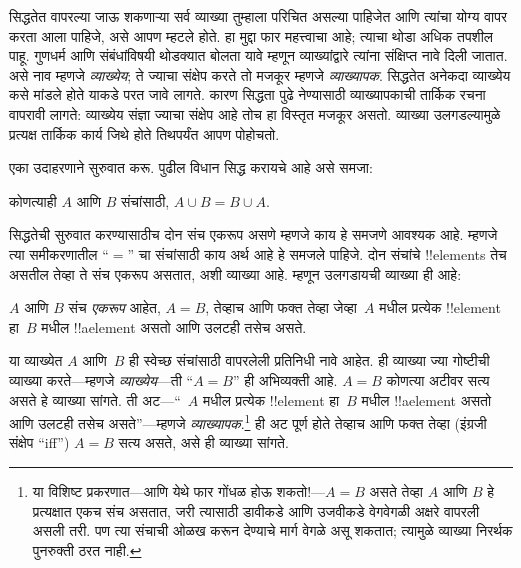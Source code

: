 \documentclass[../../../include/open-logic-section]{subfiles}
\begin{document}


सिद्धतेत वापरल्या जाऊ शकणाऱ्या सर्व व्याख्या तुम्हाला परिचित असल्या पाहिजेत आणि त्यांचा योग्य वापर करता आला पाहिजे, असे आपण म्हटले होते. हा मुद्दा फार महत्त्वाचा आहे; त्याचा थोडा अधिक तपशील पाहू. गुणधर्म आणि संबंधांविषयी थोडक्यात बोलता यावे म्हणून व्याख्यांद्वारे त्यांना संक्षिप्त नावे दिली जातात. असे नाव म्हणजे \emph{व्याख्येय}; ते ज्याचा संक्षेप करते तो मजकूर म्हणजे \emph{व्याख्यापक}. सिद्धतेत अनेकदा व्याख्येय कसे मांडले होते याकडे परत जावे लागते. कारण सिद्धता पुढे नेण्यासाठी व्याख्यापकाची तार्किक रचना वापरावी लागते: व्याख्येय संज्ञा ज्याचा संक्षेप आहे तोच हा विस्तृत मजकूर असतो. व्याख्या उलगडल्यामुळे प्रत्यक्ष तार्किक कार्य जिथे होते तिथपर्यंत आपण पोहोचतो.

एका उदाहरणाने सुरुवात करू. पुढील विधान सिद्ध करायचे आहे असे समजा:

\begin{prop}
कोणत्याही $A$ आणि $B$ संचांसाठी, $A \cup B = B \cup A$.
\end{prop}

सिद्धतेची सुरुवात करण्यासाठीच दोन संच एकरूप असणे म्हणजे काय हे समजणे आवश्यक आहे. म्हणजे त्या समीकरणातील “$=$” चा संचांसाठी काय अर्थ आहे हे समजले पाहिजे. दोन संचांचे !!{element}s तेच असतील तेव्हा ते संच एकरूप असतात, अशी व्याख्या आहे. म्हणून उलगडायची व्याख्या ही आहे:

\begin{defn}
$A$ आणि $B$ संच \emph{एकरूप} आहेत, $A = B$, तेव्हाच आणि फक्त तेव्हा जेव्हा~$A$ मधील प्रत्येक !!{element} हा~$B$ मधील !!a{element} असतो आणि उलटही तसेच असते.
\end{defn}

या व्याख्येत $A$ आणि~$B$ ही स्वेच्छ संचांसाठी वापरलेली प्रतिनिधी नावे आहेत. ही व्याख्या ज्या गोष्टीची व्याख्या करते---म्हणजे \emph{व्याख्येय}---ती “$A = B$” ही अभिव्यक्ती आहे. $A = B$ कोणत्या अटीवर सत्य असते हे व्याख्या सांगते. ती अट---“~$A$ मधील प्रत्येक !!{element} हा~$B$ मधील !!a{element} असतो आणि उलटही तसेच असते”---म्हणजे \emph{व्याख्यापक}.\footnote{या विशिष्ट प्रकरणात---आणि येथे फार गोंधळ होऊ शकतो!---$A = B$ असते तेव्हा $A$ आणि $B$ हे प्रत्यक्षात एकच संच असतात, जरी त्यासाठी डावीकडे आणि उजवीकडे वेगवेगळी अक्षरे वापरली असली तरी. पण त्या संचाची ओळख करून देण्याचे मार्ग वेगळे असू शकतात; त्यामुळे व्याख्या निरर्थक पुनरुक्ती ठरत नाही.} ही अट पूर्ण होते तेव्हाच आणि फक्त तेव्हा (इंग्रजी संक्षेप “iff”) $A = B$ सत्य असते, असे ही व्याख्या सांगते.
\end{document}
